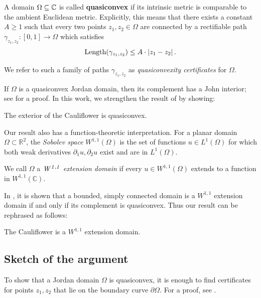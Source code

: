 A domain $\Omega\subseteq\mathbb{C}$ is called \textbf{quasiconvex} 
if its intrinsic metric is comparable to the ambient Euclidean metric. 
Explicitly, this means that there exists a constant $A\geq1$ such that every two points $z_{1},z_{2}\in\Omega$
 are connected by a rectifiable path $\gamma_{z_1,z_2}:\left[0,1\right]\to\Omega$ which satisfies
\begin{equation}
\operatorname{Length}(\gamma_{z_1,z_2})\leq A\cdot\left|z_{1}-z_{2}\right|.	
\end{equation}

We refer to such a family of paths $\gamma_{z_1,z_2}$ as \emph{quasiconvexity certificates} for $\Omega$.

If $\Omega$ is a quasiconvex Jordan domain, then its complement has a John interior; see \cite[Corollary 3.4]{hakobyan_euclidean_2008} for a proof.
In this work, we strengthen the result of \cite[Theorem 6.1]{carleson_julia_1994} by showing:

\begin{theorem}
The exterior of the Cauliflower is quasiconvex.
\end{theorem}




Our result also has a function-theoretic interpretation. 
For a planar domain $\Omega \subset \mathbb R ^2$,
the \emph{Sobolev space} $W^{1,1}(\Omega)$ 
 is the set of functions $u \in L^1(\Omega)$ for which 
 both weak derivatives $\partial_1 u, \partial_2 u$ exist and are in $L^1(\Omega)$.

We call $\Omega$ a \emph{$\it{W^{1,1}}$ extension domain} if every $u \in W^{1,1}(\Omega)$ extends to a function
in $W^{1,1}(\mathbb{C})$.

In \cite[Equation (1.1) and Theorem 1.4]{strong_bv_extension_2022}, 
it is shown that a bounded, simply connected domain
is a $W^{1,1}$ extension domain if and only if its complement is quasiconvex.
Thus our result can be rephrased as follows:


 \begin{theorem}
 The Cauliflower is a $W^{1,1}$ extension domain.
 \end{theorem}
 
\subsection{Sketch of the argument}
To show that a Jordan domain $\Omega$ is quasiconvex, it is enough to find certificates for points $z_{1},z_{2}$ that lie
on the boundary curve $\partial\Omega$. For a proof, see \cite[Corollary F]{hakobyan_euclidean_2008}.

